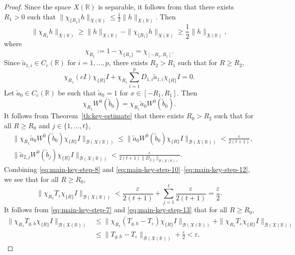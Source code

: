 \documentclass[reqno]{amsproc}
\newcommand{\cB}{\mathcal{B}}
\newcommand{\eps}{\varepsilon}
\newcommand{\R}{\mathbb{R}}
\theoremstyle{definition}
\theoremstyle{remark}
\numberwithin{equation}{section}
\begin{document}
\begin{proof}
Since the space $X(\R)$ is separable, it follows from 
\cite[Chap.~1, Definition~3.1 and Corollary~5.6]{BS88} that there
exists $R_1>0$ such that 
$\|\chi_{\{R_1\}}h\|_{X(\R)}\le\frac{1}{2}\|h\|_{X(\R)}$. Then
\begin{equation}\label{eq:main-key-step-9}
\|\chi_{R_1}h\|_{X(\R)}
\ge 
\|h\|_{X(\R)}-\|\chi_{\{R_1\}}h\|_{X(\R)}
\ge 
\frac{1}{2}\|h\|_{X(\R)},
\end{equation}
where 
\[
\chi_{R_1}:=1-\chi_{\{R_1\}}=\chi_{[-R_1,R_1]}.
\]
Since $\widetilde{a}_{1,i}\in C_c(\R)$ for $i=1,\dots,p$, there
exists $R_2>R_1$ such that for $R\ge R_2$,
\begin{equation}\label{eq:main-key-step-10}
\chi_{R_1}(cI)\chi_{\{R\}}I
+
\chi_{R_1}\sum_{i=1}^p D_{1,i}\widetilde{a}_{1,i}\chi_{\{R\}}I=0.
\end{equation}
Let $\widetilde{a}_0\in C_c(\R)$ be such that $\widetilde{a}_0=1$
for $x\in[-R_1,R_1]$. Then
\[
\chi_{R_1}W^0(\widetilde{b}_0)=\chi_{R_1}\widetilde{a}_0 W^0(\widetilde{b}_0).
\]
It follows from Theorem~\ref{th:key-estimate} that there exists 
$R_0>R_2$ such that for all $R\ge R_0$ and $j\in\{1,\dots,t\}$,
\begin{align}
&
\|\chi_{R_1}\widetilde{a}_0W^0(\widetilde{b}_0)\chi_{\{R\}}I\|_{\cB(X(\R))}
\le 
\|\widetilde{a}_0W^0(\widetilde{b}_0)\chi_{\{R\}}I\|_{\cB(X(\R))}
<
\frac{\eps}{2(t+1)},
\label{eq:main-key-step-11}
\\
&
\|\widetilde{a}_{2,j}W^0(\widetilde{b}_j)\chi_{\{R\}}I\|_{\cB(X(\R))}
<
\frac{\eps}{2(t+1)\|D_{2,j}\|_{\cB(X(\R))}}.
\label{eq:main-key-step-12}
\end{align}
Combining \eqref{eq:main-key-step-8} and
\eqref{eq:main-key-step-10}--\eqref{eq:main-key-step-12}, we see that
for all $R\ge R_0$,
\begin{equation}\label{eq:main-key-step-13}
\|\chi_{R_1}T_\eps\chi_{\{R\}}I\|_{\cB(X(\R))}
<\frac{\eps}{2(t+1)}+\sum_{j=1}^t\frac{\eps}{2(t+1)}=\frac{\eps}{2}.
\end{equation}
It follows from \eqref{eq:main-key-step-7} and \eqref{eq:main-key-step-13}
that for all $R\ge R_0$,
\begin{align}
\|\chi_{R_1} T_{g,h}\chi_{\{R\}}I\|_{\cB(X(\R))}
&
\le
\|\chi_{R_1} (T_{g,h}-T_\eps)\chi_{\{R\}}I\|_{\cB(X(\R))}
+
\|\chi_{R_1} T_\eps\chi_{\{R\}}I\|_{\cB(X(\R))}
\nonumber\\
&\le
\|T_{g,h}-T_\eps\|_{\cB(X(\R))}+\frac{\eps}{2}<\eps.
\label{eq:main-key-step-14}
\end{align}


\end{proof}
\end{document}
